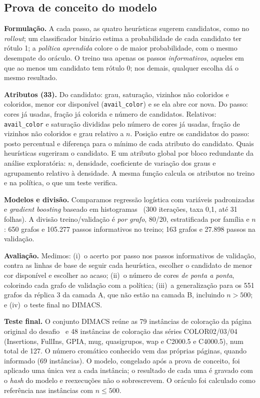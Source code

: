 \documentclass[conference,a4paper]{IEEEtran}
\begin{document}
\subsection{Prova de conceito do modelo}\label{sec:modelo}
\textbf{Formulação.} A cada passo, as quatro heurísticas sugerem candidatos, como no
\emph{rollout}; um classificador binário estima a probabilidade de cada candidato ter rótulo
1; a \emph{política aprendida} colore o de maior probabilidade, com o mesmo desempate do
oráculo. O treino usa apenas os passos \emph{informativos}, aqueles em que ao menos um
candidato tem rótulo 0; nos demais, qualquer escolha dá o mesmo resultado.

\textbf{Atributos (33).} Do candidato: grau, saturação, vizinhos não coloridos e coloridos,
menor cor disponível (\texttt{avail\_color}) e se ela abre cor nova. Do passo: cores já
usadas, fração já colorida e número de candidatos. Relativos: \texttt{avail\_color} e
saturação divididas pelo número de cores já usadas, fração de vizinhos não coloridos e grau
relativo a $n$. Posição entre os candidatos do passo: posto percentual e diferença para o
mínimo de cada atributo do candidato. Quais heurísticas sugeriram o candidato. E um atributo
global por bloco redundante da análise exploratória: $n$, densidade, coeficiente de variação
dos graus e agrupamento relativo à densidade. A mesma função calcula os atributos no treino e
na política, o que um teste verifica.

\textbf{Modelos e divisão.} Comparamos regressão logística com variáveis padronizadas e
\emph{gradient boosting} baseado em histogramas~\cite{friedman2001,ke2017} (300 iterações,
taxa 0,1, até 31 folhas). A divisão treino/validação é \emph{por grafo}, 80/20, estratificada
por família e $n$: 650 grafos e 105.277 passos informativos no treino; 163 grafos e 27.898
passos na validação.

\textbf{Avaliação.} Medimos: (i)~o acerto por passo nos passos informativos de validação,
contra as linhas de base de seguir cada heurística, escolher o candidato de menor cor
disponível e escolher ao acaso; (ii)~o número de cores \emph{de ponta a ponta}, colorindo cada
grafo de validação com a política; (iii)~a generalização para os 551 grafos da réplica 3 da
camada A, que não estão na camada B, incluindo $n>500$; e (iv)~o teste final no DIMACS.

\textbf{Teste final.} O conjunto DIMACS reúne as 79 instâncias de coloração da página original
do desafio~\cite{trickcolor} e 48 instâncias de coloração das séries
COLOR02/03/04~\cite{color04} (Insertions, FullIns, GPIA, mug, quasigrupos, wap e C2000.5 e
C4000.5), num total de 127. O número cromático conhecido vem das próprias páginas, quando
informado (69 instâncias). O modelo, congelado após a prova de conceito, foi aplicado uma única
vez a cada instância; o resultado de cada uma é gravado com o \emph{hash} do modelo e
reexecuções não o sobrescrevem. O oráculo foi calculado como referência nas instâncias com
$n\le500$.
\end{document}
